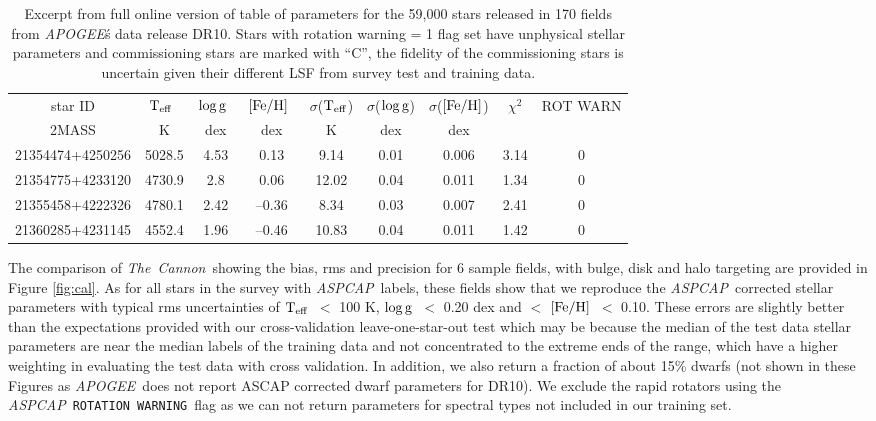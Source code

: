 \documentclass[12pt, preprint]{aastex}
\newcommand{\teff}{\mbox{$\rm T_{eff}$}}
\newcommand{\feh}{\mbox{$\rm [Fe/H]$}}
\newcommand{\logg}{\mbox{$\rm \log g$}}
\newcommand{\tc}{\textsl{The~Cannon}}
\newcommand{\apogee}{\textsl{APOGEE}}
\newcommand{\aspcap}{\textsl{ASPCAP}}
\newcommand{\rotwarn}{\texttt{ROTATION WARNING}}
\begin{document}
\begin{table}[!h]
\small{
\centering
\caption{Excerpt from full online version of table of parameters for the 59,000 stars released in 170 fields from \apogee\'s data release DR10. Stars with rotation warning = 1 flag set have unphysical stellar parameters and commissioning stars are marked with ``C'', the fidelity of the commissioning stars is uncertain given their different LSF from survey test and training data.} \begin{tabular}{| c | c | c |  c | c | c |  c | c | c |} %
\hline
star ID & \teff\ & \logg\ & \feh\ & $\sigma$(\teff) & $\sigma$(\logg) & $\sigma$(\feh) & $\chi^2$ & \tiny{ROT WARN}\\
{2MASS} &  K &  dex  & dex & K & dex & dex & & \\    
\hline
21354474+4250256 & 5028.5 & 4.53 & 0.13 & 9.14 & 0.01 & 0.006 & 3.14 & 0\\
21354775+4233120 & 4730.9 & 2.8 & 0.06 & 12.02 & 0.04 & 0.011 & 1.34 & 0\\
21355458+4222326 & 4780.1 & 2.42 & --0.36 & 8.34 & 0.03 & 0.007 & 2.41 & 0\\
21360285+4231145 &  4552.4 &  1.96 & --0.46  & 10.83 & 0.04 & 0.011 &  1.42 &  0\\
 \hline
\end{tabular}
\label{tab:online} }
\end{table}  
 

The comparison of \tc\, showing the bias, rms and precision for 6 sample fields, with bulge, disk and halo targeting are provided in Figure \ref{fig:cal}. As for all stars in the survey with \aspcap\ labels, these fields show that we reproduce the \aspcap\ corrected stellar parameters with typical rms uncertainties of \teff\ $<$ 100 K, \logg\ $<$ 0.20 dex and $<$ \feh\ $<$ 0.10. These errors are slightly better than the expectations provided with our cross-validation leave-one-star-out test which may be because the median of the test data stellar parameters are near the median labels of the training data and not concentrated to the extreme ends of the range, which have a higher weighting in evaluating the test data with cross validation. In addition, we also return a fraction of about 15\% dwarfs (not shown in these Figures as \apogee\ does not report ASCAP corrected dwarf parameters for DR10). We exclude the rapid rotators using the \aspcap\ \rotwarn\ flag as we can not return parameters for spectral types not included in our training set. 
\end{document}
